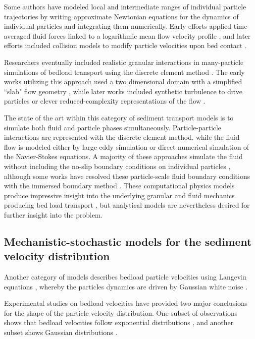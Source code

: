 Some authors have modeled local and intermediate ranges of individual particle trajectories by writing approximate Newtonian equations for the dynamics of individual particles and integrating them numerically. Early efforts applied time-averaged fluid forces linked to a logarithmic mean flow velocity profile \citep{Yalin1963,VanRijn1984}, and later efforts included collision models to modify particle velocities upon bed contact \citep{Wiberg1985,Sekine1992,Nino1998}.

Researchers eventually included realistic granular interactions in many-particle simulations of bedload transport using the discrete element method \citep[e.g.][]{Cundall1979, Wachs2019}.
The early works utilizing this approach used a two dimensional domain with a simplified ``slab" flow geometry \citep{Haff1993,Gotoh1997}, while later works included synthetic turbulence to drive particles \citep{Schmeeckle2003,Maurin2015} or clever reduced-complexity representations of the flow \citep{Clark2015,Clark2017}.

The state of the art within this category of sediment transport models is to simulate both fluid and particle phases simultaneously.
Particle-particle interactions are represented with the discrete element method, while the fluid flow is modeled either by large eddy simulation or direct numerical simulation of the Navier-Stokes equations.
A majority of these approaches simulate the fluid without including the no-slip boundary conditions on individual particles \citep[e.g.][]{Vowinckel2014,Schmeeckle2014,Gonzalez2017}, although some works have resolved these particle-scale fluid boundary conditions with the immersed boundary method \citep[e.g.][]{Ji2013, Ji2014, Elghannay2017, Yousefi2020}.
These computational physics models produce impressive insight into the underlying granular and fluid mechanics producing bed load transport \citep{Frey2011}, but analytical models are nevertheless desired for further insight into the problem.

\subsection{Mechanistic-stochastic models for the sediment velocity distribution}
\label{sec:langevin}

Another category of models describes bedload particle velocities using Langevin equations \citep{Ancey2014,Fan2014}, whereby the particles dynamics are driven by Gaussian white noise \citep{Kubo1978}.

Experimental studies on bedload velocities have provided two major conclusions for the shape of the particle velocity distribution. One subset of observations shows that bedload velocities follow exponential distributions \citep{Lajeunesse2010,Furbish2012,Fathel2015}, and another subset shows Gaussian distributions \citep{Martin2012,Ancey2014,Heyman2016}.

